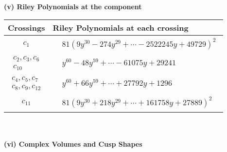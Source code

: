 \documentclass[1p]{elsarticle_modified}
\theoremstyle{definition}
\begin{document}
\newpage\renewcommand{\arraystretch}{1}
\flushleft \textbf{(v) Riley Polynomials at the component}\newline \\
\begin{tabular}{m{50pt}|m{274pt}}
Crossings & \hspace{64pt}Riley Polynomials at each crossing \\
\hline $$\begin{aligned}c_{1}\end{aligned}$$&$\begin{aligned}
&81(9 y^{30}-274 y^{29}+\cdots-2522245 y+49729)^{2}
\end{aligned}$\\
\hline $$\begin{aligned}c_{2},c_{3},c_{6}\\c_{10}\end{aligned}$$&$\begin{aligned}
&y^{60}-48 y^{59}+\cdots-61075 y+29241
\end{aligned}$\\
\hline $$\begin{aligned}c_{4},c_{5},c_{7}\\c_{8},c_{9},c_{12}\end{aligned}$$&$\begin{aligned}
&y^{60}+66 y^{59}+\cdots+27792 y+1296
\end{aligned}$\\
\hline $$\begin{aligned}c_{11}\end{aligned}$$&$\begin{aligned}
&81(9 y^{30}+218 y^{29}+\cdots+161758 y+27889)^{2}
\end{aligned}$\\
\hline
\end{tabular}\\~\\
\newpage\flushleft \textbf{(vi) Complex Volumes and Cusp Shapes}
\end{document}

